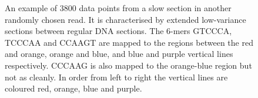 \begin{figure}
\centering

\caption{\label{fig:dna-section}An example of 3800 data points from a slow section in another randomly chosen read. It is characterised by extended low-variance sections between regular DNA sections. The 6-mers GTCCCA, TCCCAA and CCAAGT are mapped to the regions between the red and orange, orange and blue, and blue and purple vertical lines respectively. CCCAAG is also mapped to the orange-blue region but not as cleanly. In order from left to right the vertical lines are coloured red, orange, blue and purple.}
\end{figure}
